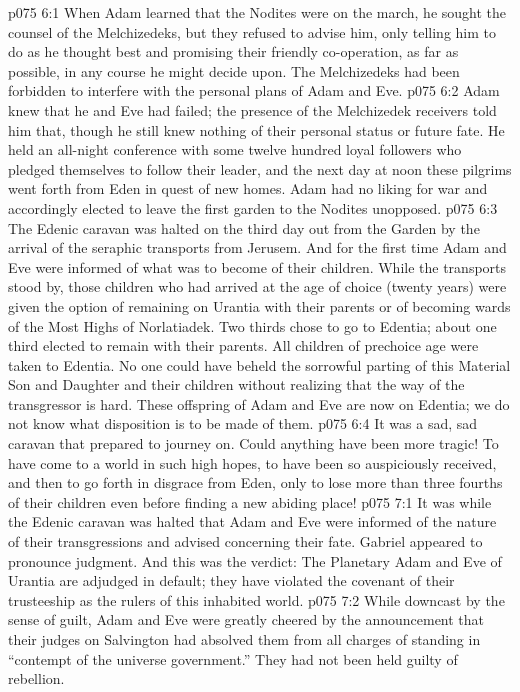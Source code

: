 \vs p075 6:1 When Adam learned that the Nodites were on the march, he sought the counsel of the Melchizedeks, but they refused to advise him, only telling him to do as he thought best and promising their friendly co\hyp{}operation, as far as possible, in any course he might decide upon. The Melchizedeks had been forbidden to interfere with the personal plans of Adam and Eve.
\vs p075 6:2 Adam knew that he and Eve had failed; the presence of the Melchizedek receivers told him that, though he still knew nothing of their personal status or future fate. He held an all\hyp{}night conference with some twelve hundred loyal followers who pledged themselves to follow their leader, and the next day at noon these pilgrims went forth from Eden in quest of new homes. Adam had no liking for war and accordingly elected to leave the first garden to the Nodites unopposed.
\vs p075 6:3 The Edenic caravan was halted on the third day out from the Garden by the arrival of the seraphic transports from Jerusem. And for the first time Adam and Eve were informed of what was to become of their children. While the transports stood by, those children who had arrived at the age of choice (twenty years) were given the option of remaining on Urantia with their parents or of becoming wards of the Most Highs of Norlatiadek. Two thirds chose to go to Edentia; about one third elected to remain with their parents. All children of prechoice age were taken to Edentia. No one could have beheld the sorrowful parting of this Material Son and Daughter and their children without realizing that the way of the transgressor is hard. These offspring of Adam and Eve are now on Edentia; we do not know what disposition is to be made of them.
\vs p075 6:4 It was a sad, sad caravan that prepared to journey on. Could anything have been more tragic! To have come to a world in such high hopes, to have been so auspiciously received, and then to go forth in disgrace from Eden, only to lose more than three fourths of their children even before finding a new abiding place!
\vs p075 7:1 It was while the Edenic caravan was halted that Adam and Eve were informed of the nature of their transgressions and advised concerning their fate. Gabriel appeared to pronounce judgment. And this was the verdict: The Planetary Adam and Eve of Urantia are adjudged in default; they have violated the covenant of their trusteeship as the rulers of this inhabited world.
\vs p075 7:2 While downcast by the sense of guilt, Adam and Eve were greatly cheered by the announcement that their judges on Salvington had absolved them from all charges of standing in “contempt of the universe government.” They had not been held guilty of rebellion.
